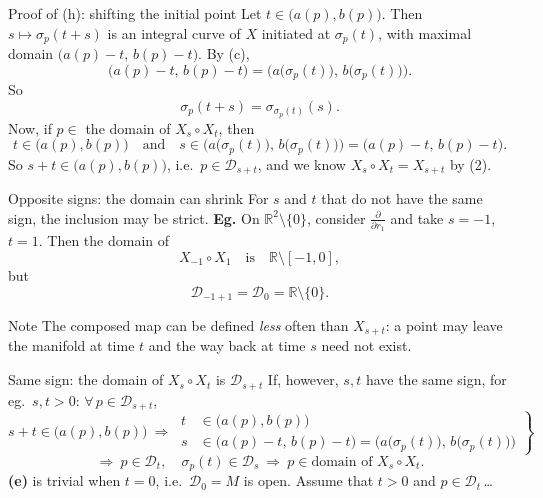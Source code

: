 \documentclass[10pt]{beamer}
\newcommand{\R}{\mathbb{R}}
\newcommand{\D}{\mathcal{D}}
\begin{document}
\begin{frame}{Proof of (h): shifting the initial point}
	Let $t \in \bigl( a(p), b(p) \bigr)$. Then
	$s \longmapsto \sigma_p(t + s)$ is an integral curve of $X$
	initiated at $\sigma_p(t)$, with maximal domain
	$\bigl( a(p) - t,\, b(p) - t \bigr)$. By (c),
	\[
		\bigl( a(p) - t,\, b(p) - t \bigr)
		= \bigl( a\bigl(\sigma_p(t)\bigr),\,
		b\bigl(\sigma_p(t)\bigr) \bigr).
	\]
	So
	\[
		\sigma_p(t + s) = \sigma_{\sigma_p(t)}(s). \tag{2}
	\]
	Now, if $p \in$ the domain of $X_s \circ X_t$, then
	\[
		t \in \bigl( a(p), b(p) \bigr)
		\quad \text{and} \quad
		s \in \bigl( a\bigl(\sigma_p(t)\bigr),\,
		b\bigl(\sigma_p(t)\bigr) \bigr)
		= \bigl( a(p) - t,\, b(p) - t \bigr).
	\]
	So $s + t \in \bigl( a(p), b(p) \bigr)$, i.e.\ $p \in \D_{s+t}$,
	and we know $X_s \circ X_t = X_{s+t}$ by (2).
\end{frame}

\begin{frame}{Opposite signs: the domain can shrink}
	For $s$ and $t$ that do not have the same sign, the inclusion may
	be strict. \textbf{Eg.} On $\R^2 \setminus \{0\}$, consider
	$\frac{\partial}{\partial r_1}$ and take $s = -1$, $t = 1$. Then
	the domain of
	\[
		X_{-1} \circ X_1 \quad \text{is} \quad
		\R \setminus [-1, 0],
	\]
	but
	\[
		\D_{-1+1} = \D_0 = \R \setminus \{0\}.
	\]
	\medskip
	\begin{block}{Note}
		The composed map can be defined \emph{less} often than
		$X_{s+t}$: a point may leave the manifold at time $t$ and the
		way back at time $s$ need not exist.
	\end{block}
\end{frame}

\begin{frame}{Same sign: the domain of $X_s \circ X_t$ is $\D_{s+t}$}
	If, however, $s, t$ have the same sign, for eg.\ $s, t > 0$:
	$\forall\, p \in \D_{s+t}$,
	\[
		s + t \in \bigl( a(p), b(p) \bigr)
		\ \Rightarrow\
		\left.\begin{aligned}
			t & \in \bigl( a(p), b(p) \bigr)           \\
			s & \in \bigl( a(p) - t,\, b(p) - t \bigr)
			= \bigl( a\bigl(\sigma_p(t)\bigr),\,
			b\bigl(\sigma_p(t)\bigr) \bigr)
		\end{aligned}\right\}
	\]
	\[
		\Rightarrow\
		p \in \D_t,\quad \sigma_p(t) \in \D_s
		\ \Rightarrow\
		p \in \text{domain of } X_s \circ X_t .
	\]
	\medskip
	\textbf{(e)} is trivial when $t = 0$, i.e.\ $\D_0 = M$ is open.
	Assume that $t > 0$ and $p \in \D_t$\,\dots
\end{frame}
\end{document}
